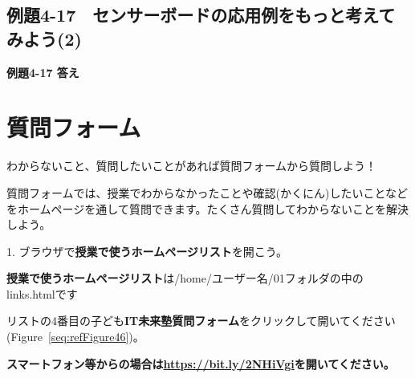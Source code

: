\documentclass[a4paper,12pt]{jarticle}
\newcounter{Figure}
\begin{document}
\bigskip


\bigskip


\bigskip


\bigskip


\bigskip


\bigskip


\bigskip


\clearpage
\subsection{例題4-17　センサーボードの応用例をもっと考えてみよう(2)}
\bigskip
\bigskip

{\bfseries
例題4-17 答え}


\bigskip


\bigskip


\bigskip


\bigskip


\bigskip


\bigskip


\bigskip




\clearpage\section{質問フォーム}
わからないこと、質問したいことがあれば質問フォームから質問しよう！

質問フォームでは、授業でわからなかったことや確認(かくにん)したいことなどをホームページを通して質問できます。たくさん質問してわからないことを解決しよう。

\bigskip

\bigskip

1.
ブラウザで\textbf{授業で使うホームページリスト}を開こう。

\bigskip

\textbf{授業で使うホームページリスト}は/home/ユーザー名/01フォルダの中のlinks.htmlです

リストの4番目の子ども\textbf{IT未来塾質問フォーム}をクリックして開いてください(Figure~\ref{seq:refFigure46})。


\bigskip

{\bfseries
スマートフォン等からの場合は\url{https://bit.ly/2NHiVgi}を開いてください。}
\end{document}
